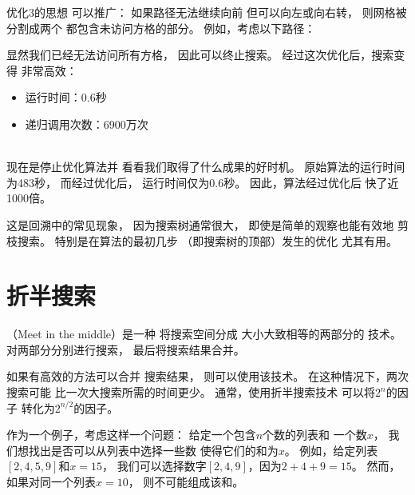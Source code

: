 优化3的思想
可以推广：
如果路径无法继续向前
但可以向左或向右转，
则网格被分割成两个
都包含未访问方格的部分。
例如，考虑以下路径：

\begin{center}
\end{center}
显然我们已经无法访问所有方格，
因此可以终止搜索。
经过这次优化后，搜索变得
非常高效：

\begin{itemize}
\item
运行时间：0.6秒
\item
递归调用次数：6900万次
\end{itemize}

~\\
现在是停止优化算法并
看看我们取得了什么成果的好时机。
原始算法的运行时间
为483秒，
而经过优化后，
运行时间仅为0.6秒。
因此，算法经过优化后
快了近1000倍。

这是回溯中的常见现象，
因为搜索树通常很大，
即使是简单的观察也能有效地
剪枝搜索。
特别是在算法的最初几步
（即搜索树的顶部）发生的优化
尤其有用。

\section{折半搜索}


（Meet in the middle）是一种
将搜索空间分成
大小大致相等的两部分的
技术。
对两部分分别进行搜索，
最后将搜索结果合并。

如果有高效的方法可以合并
搜索结果，
则可以使用该技术。
在这种情况下，两次搜索可能
比一次大搜索所需的时间更少。
通常，使用折半搜索技术
可以将$2^n$的因子
转化为$2^{n/2}$的因子。

作为一个例子，考虑这样一个问题：
给定一个包含$n$个数的列表和
一个数$x$，
我们想找出是否可以从列表中选择一些数
使得它们的和为$x$。
例如，给定列表$[2,4,5,9]$和$x=15$，
我们可以选择数字$[2,4,9]$，因为$2+4+9=15$。
然而，如果对同一个列表$x=10$，
则不可能组成该和。

